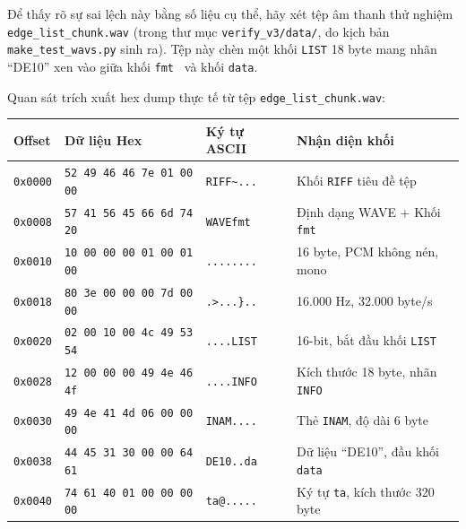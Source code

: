 Để thấy rõ sự sai lệch này bằng số liệu cụ thể, hãy xét tệp âm thanh thử nghiệm \texttt{edge\_list\_chunk.wav} (trong thư mục \texttt{verify\_v3/data/}, do kịch bản \texttt{make\_test\_wavs.py} sinh ra). Tệp này chèn một khối \texttt{LIST} 18 byte mang nhãn ``DE10'' xen vào giữa khối \texttt{fmt~} và khối \texttt{data}.

Quan sát trích xuất hex dump thực tế từ tệp \texttt{edge\_list\_chunk.wav}:
\begin{center}
\footnotesize
\begin{tabular}{llll}
\toprule
Offset & Dữ liệu Hex & Ký tự ASCII & Nhận diện khối \\
\midrule
\texttt{0x0000} & \texttt{52 49 46 46 7e 01 00 00} & \texttt{RIFF\textasciitilde...} & Khối \texttt{RIFF} tiêu đề tệp \\
\texttt{0x0008} & \texttt{57 41 56 45 66 6d 74 20} & \texttt{WAVEfmt } & Định dạng WAVE + Khối \texttt{fmt } \\
\texttt{0x0010} & \texttt{10 00 00 00 01 00 01 00} & \texttt{........} & 16 byte, PCM không nén, mono \\
\texttt{0x0018} & \texttt{80 3e 00 00 00 7d 00 00} & \texttt{.>...\}..} & 16.000 Hz, 32.000 byte/s \\
\texttt{0x0020} & \texttt{02 00 10 00 4c 49 53 54} & \texttt{....LIST} & 16-bit, bắt đầu khối \texttt{LIST} \\
\texttt{0x0028} & \texttt{12 00 00 00 49 4e 46 4f} & \texttt{....INFO} & Kích thước 18 byte, nhãn \texttt{INFO} \\
\texttt{0x0030} & \texttt{49 4e 41 4d 06 00 00 00} & \texttt{INAM....} & Thẻ \texttt{INAM}, độ dài 6 byte \\
\texttt{0x0038} & \texttt{44 45 31 30 00 00 64 61} & \texttt{DE10..da} & Dữ liệu ``DE10'', đầu khối \texttt{data} \\
\texttt{0x0040} & \texttt{74 61 40 01 00 00 00 00} & \texttt{ta@.....} & Ký tự \texttt{ta}, kích thước 320 byte \\
\bottomrule
\end{tabular}
\end{center}

